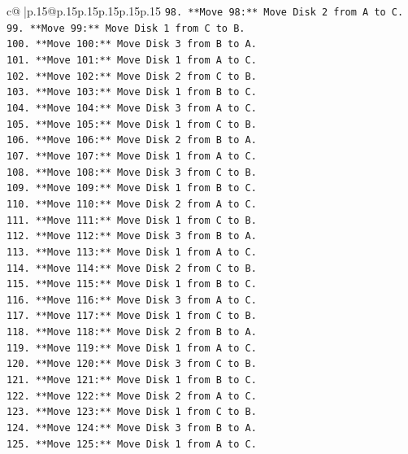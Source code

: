 \documentclass{article}
\begin{document}
{\begin{supertabular}{c@{$\;$}|p{.15\linewidth}@{}p{.15\linewidth}p{.15\linewidth}p{.15\linewidth}p{.15\linewidth}p{.15\linewidth}}
{{{\texttt{98. **Move 98:** Move Disk 2 from A to C.} \\
\texttt{99. **Move 99:** Move Disk 1 from C to B.} \\
\texttt{100. **Move 100:** Move Disk 3 from B to A.} \\
\texttt{101. **Move 101:** Move Disk 1 from A to C.} \\
\texttt{102. **Move 102:** Move Disk 2 from C to B.} \\
\texttt{103. **Move 103:** Move Disk 1 from B to C.} \\
\texttt{104. **Move 104:** Move Disk 3 from A to C.} \\
\texttt{105. **Move 105:** Move Disk 1 from C to B.} \\
\texttt{106. **Move 106:** Move Disk 2 from B to A.} \\
\texttt{107. **Move 107:** Move Disk 1 from A to C.} \\
\texttt{108. **Move 108:** Move Disk 3 from C to B.} \\
\texttt{109. **Move 109:** Move Disk 1 from B to C.} \\
\texttt{110. **Move 110:** Move Disk 2 from A to C.} \\
\texttt{111. **Move 111:** Move Disk 1 from C to B.} \\
\texttt{112. **Move 112:** Move Disk 3 from B to A.} \\
\texttt{113. **Move 113:** Move Disk 1 from A to C.} \\
\texttt{114. **Move 114:** Move Disk 2 from C to B.} \\
\texttt{115. **Move 115:** Move Disk 1 from B to C.} \\
\texttt{116. **Move 116:** Move Disk 3 from A to C.} \\
\texttt{117. **Move 117:** Move Disk 1 from C to B.} \\
\texttt{118. **Move 118:** Move Disk 2 from B to A.} \\
\texttt{119. **Move 119:** Move Disk 1 from A to C.} \\
\texttt{120. **Move 120:** Move Disk 3 from C to B.} \\
\texttt{121. **Move 121:** Move Disk 1 from B to C.} \\
\texttt{122. **Move 122:** Move Disk 2 from A to C.} \\
\texttt{123. **Move 123:** Move Disk 1 from C to B.} \\
\texttt{124. **Move 124:** Move Disk 3 from B to A.} \\
\texttt{125. **Move 125:** Move Disk 1 from A to C.} \\
}}}
\end{supertabular}}
\end{document}
